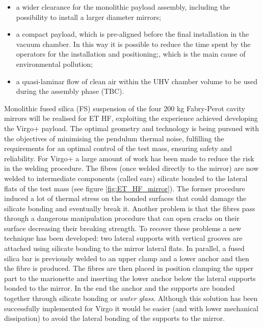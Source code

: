 \begin{itemize}
\item	a wider clearance for the monolithic payload assembly, including the possibility to install a larger diameter mirrors;
\item	a compact payload, which is  pre-aligned before the final installation in the vacuum chamber. In this way it is possible to reduce the time spent by the operators for the installation and positioning;, which is the main cause of environmental pollution;
\item	a quasi-laminar flow of clean air within the UHV chamber volume to be used during the assembly phase (TBC).
\end{itemize}



Monolithic fused silica (FS) suspension of the four 200 kg Fabry-Perot cavity mirrors will be realised for ET HF, exploiting the experience achieved developing the Virgo+ payload. The optimal geometry and technology is being pursued with the objectives of minimising the pendulum thermal noise, fulfilling the requirements for an optimal control of the test mass, ensuring safety and reliability. For Virgo+ a large amount of work has been made to reduce the risk in the welding procedure. The fibres (once welded directly to the mirror) are now welded to intermediate components (called ears) silicate bonded to the lateral flats of the test mass (see figure \ref{fig:ET_HF_mirror}). The former procedure induced a lot of thermal stress on the bonded surfaces that could damage the silicate bonding and eventually break it. Another problem is that the fibres pass through a dangerous manipulation procedure that can open cracks on their surface decreasing their breaking strength. To recover these problems a new technique has been developed: two lateral supports with vertical grooves are attached using silicate bonding to the mirror lateral flats.  In parallel, a fused silica bar is previously welded to an upper clamp and a lower anchor and then the fibre is produced. The fibres are then placed in position clamping the upper part to the marionette and inserting the lower anchor below the lateral supports bonded to the mirror. In the end the anchor and the supports are bonded together through silicate bonding or {\it water glass}.
Although this solution has been successfully implemented for Virgo it would be easier (and with lower mechanical dissipation) to avoid the lateral bonding of the supports to the mirror. 

